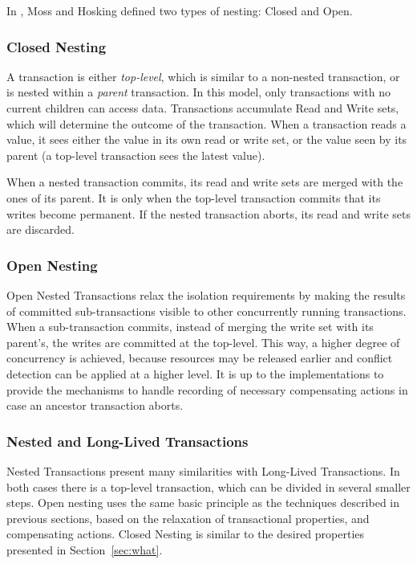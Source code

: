 \documentclass{llncs}
\begin{document}
In \cite{moss2006nested}, Moss and Hosking defined two types of
nesting: Closed and Open.

\subsubsection{Closed Nesting}

A transaction is either {\it top-level}, which is similar to a
non-nested transaction, or is nested within a {\it parent}
transaction. In this model, only transactions with no current children
can access data. Transactions accumulate Read and Write sets, which
will determine the outcome of the transaction. When a transaction
reads a value, it sees either the value in its own read or write set,
or the value seen by its parent (a top-level transaction sees the
latest value).

When a nested transaction commits, its read and write sets are merged
with the ones of its parent. It is only when the top-level transaction
commits that its writes become permanent. If the nested transaction
aborts, its read and write sets are discarded.

\subsubsection{Open Nesting}

Open Nested Transactions relax the isolation requirements by making
the results of committed sub-transactions visible to other
concurrently running transactions. When a sub-transaction commits,
instead of merging the write set with its parent's, the writes are
committed at the top-level. This way, a higher degree of concurrency
is achieved, because resources may be released earlier and conflict
detection can be applied at a higher level. It is up to the
implementations to provide the mechanisms to handle recording of
necessary compensating actions in case an ancestor transaction aborts.

\subsubsection{Nested and Long-Lived Transactions}

Nested Transactions present many similarities with Long-Lived
Transactions. In both cases there is a top-level transaction, which
can be divided in several smaller steps. Open nesting uses the same
basic principle as the techniques described in previous sections,
based on the relaxation of transactional properties, and compensating
actions. Closed Nesting is similar to the desired properties presented
in Section~\ref{sec:what}.
\end{document}
